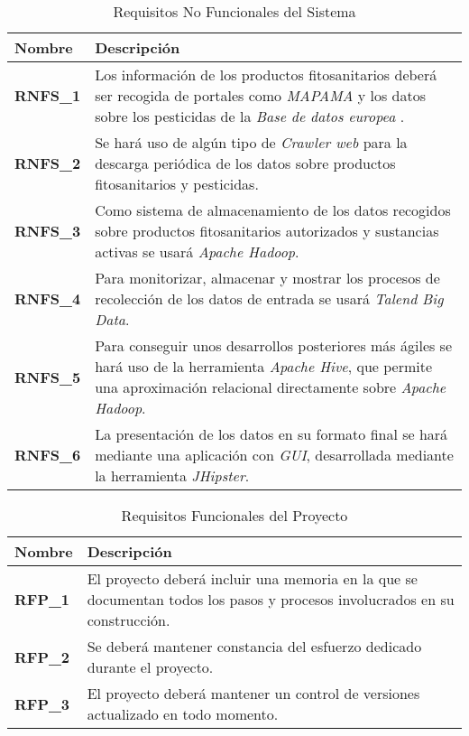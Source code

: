 \begin{table}[!h]
\centering
\bgroup
\def\arraystretch{1.3}
\begin{tabular}{l p{13cm}}
\toprule
\textbf{Nombre} & \textbf{Descripción} \\
 \midrule
\textbf{RNFS\_1} & 
Los información de los productos fitosanitarios deberá ser recogida de portales como \textit{MAPAMA} \cite{mapama} y los datos sobre los pesticidas de la \textit{Base de datos europea} \cite{pesticides_eu}.
 \\
\textbf{RNFS\_2} & 
Se hará uso de algún tipo de \textit{Crawler web} \cite{wikicrawler} para la descarga periódica de los datos sobre productos fitosanitarios y pesticidas.
 \\
\textbf{RNFS\_3} & 
Como sistema de almacenamiento de los datos recogidos sobre productos fitosanitarios autorizados y sustancias activas se usará \textit{Apache Hadoop}.
 \\
\textbf{RNFS\_4} & 
Para monitorizar, almacenar y mostrar los procesos de recolección de los datos de entrada se usará \textit{Talend Big Data}. 
 \\
\textbf{RNFS\_5} & 
Para conseguir unos desarrollos posteriores más ágiles se hará uso de la herramienta \textit{Apache Hive}, que permite una aproximación relacional directamente sobre \textit{Apache Hadoop}.
 \\
\textbf{RNFS\_6} & 
La presentación de los datos en su formato final se hará mediante una aplicación con \textit{GUI}, desarrollada mediante la herramienta \textit{JHipster}.
 \\
\bottomrule
\end{tabular}
\egroup
\caption{Requisitos No Funcionales del Sistema}
\label{tab:req_no_func_sist}
\end{table}

\newpage
\begin{table}[t]
\begin{tabular}{l p{13cm}}
\toprule
\textbf{Nombre} & \textbf{Descripción} \\
 \midrule
\textbf{RFP\_1} & 
El proyecto deberá incluir una memoria en la que se documentan todos los pasos y procesos involucrados en su construcción.
 \\
\textbf{RFP\_2} & 
Se deberá mantener constancia del esfuerzo dedicado durante el proyecto.
 \\
\textbf{RFP\_3} &
El proyecto deberá mantener un control de versiones actualizado en todo momento. 
 \\
\bottomrule
\end{tabular}
\caption{Requisitos Funcionales del Proyecto}
\vspace*{-11pt}
\label{tab:req_func_proy}
\end{table}












 


















